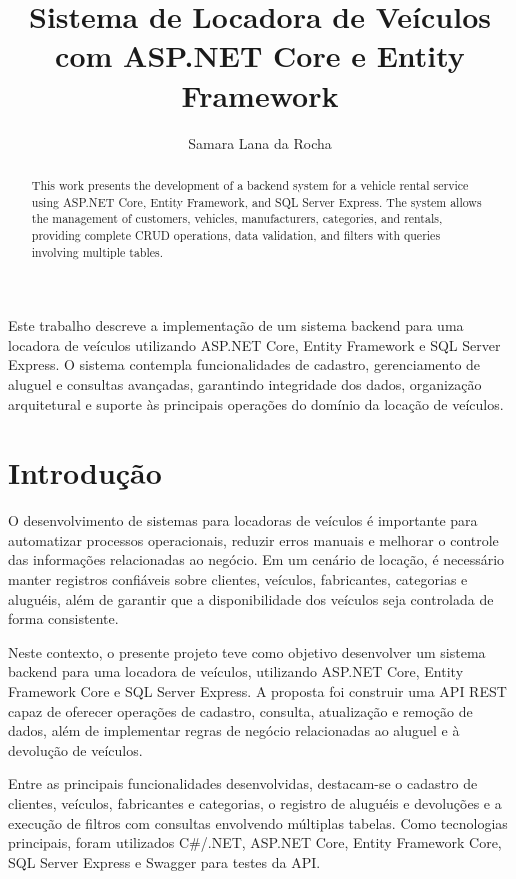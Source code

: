 \documentclass[12pt]{article}
\title{Sistema de Locadora de Veículos com ASP.NET Core e Entity Framework}
\author{Samara Lana da Rocha}
\begin{document}
\maketitle

\begin{abstract}
This work presents the development of a backend system for a vehicle rental service using ASP.NET Core, Entity Framework, and SQL Server Express. The system allows the management of customers, vehicles, manufacturers, categories, and rentals, providing complete CRUD operations, data validation, and filters with queries involving multiple tables.
\end{abstract}

\begin{resumo}
Este trabalho descreve a implementação de um sistema backend para uma locadora de veículos utilizando ASP.NET Core, Entity Framework e SQL Server Express. O sistema contempla funcionalidades de cadastro, gerenciamento de aluguel e consultas avançadas, garantindo integridade dos dados, organização arquitetural e suporte às principais operações do domínio da locação de veículos.
\end{resumo}

\section{Introdução}

O desenvolvimento de sistemas para locadoras de veículos é importante para automatizar processos operacionais, reduzir erros manuais e melhorar o controle das informações relacionadas ao negócio. Em um cenário de locação, é necessário manter registros confiáveis sobre clientes, veículos, fabricantes, categorias e aluguéis, além de garantir que a disponibilidade dos veículos seja controlada de forma consistente.

Neste contexto, o presente projeto teve como objetivo desenvolver um sistema backend para uma locadora de veículos, utilizando ASP.NET Core, Entity Framework Core e SQL Server Express. A proposta foi construir uma API REST capaz de oferecer operações de cadastro, consulta, atualização e remoção de dados, além de implementar regras de negócio relacionadas ao aluguel e à devolução de veículos.

Entre as principais funcionalidades desenvolvidas, destacam-se o cadastro de clientes, veículos, fabricantes e categorias, o registro de aluguéis e devoluções e a execução de filtros com consultas envolvendo múltiplas tabelas. Como tecnologias principais, foram utilizados C\#/.NET, ASP.NET Core, Entity Framework Core, SQL Server Express e Swagger para testes da API.
\end{document}
